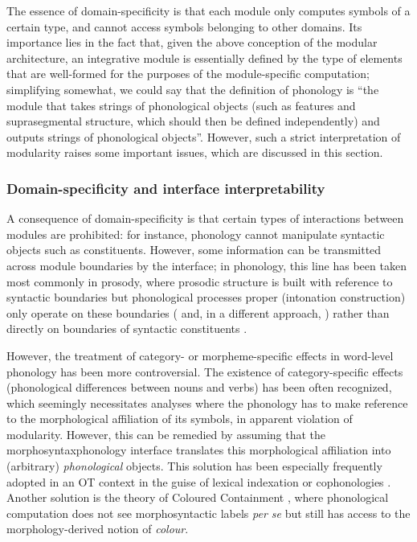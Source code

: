 The essence of domain\hyp specificity is that each module only computes symbols of a certain type, and cannot access symbols belonging to other domains. Its importance lies in the fact that, given the above conception of the modular architecture, an integrative module is essentially defined by the type of elements that are well\hyp formed for the purposes of the module\hyp specific computation; simplifying somewhat, we could say that the definition of phonology is \enquote{the module that takes strings of phonological objects (such as features and suprasegmental structure, which should then be defined independently) and outputs strings of phonological objects}. However, such a strict interpretation of modularity raises some important issues, which are discussed in this section.

\subsubsection{Domain-specificity and interface interpretability}
\label{sec:doma-spec-interf}

A consequence of domain\hyp specificity is that certain types of interactions between modules are prohibited: for instance, phonology cannot manipulate syntactic objects such as constituents. However, some information can be transmitted across module boundaries by the interface; in phonology, this line has been taken most commonly in prosody, where prosodic structure is built with reference to syntactic boundaries but phonological processes proper (\eg intonation construction) only operate on these boundaries (\citealp[\eg][]{selkirk,nspvgl,truckenbrodt,seidl} and, in a different approach, \citealt{scheer10:_guide_morph}) rather than directly on boundaries of syntactic constituents \citep[\egm][]{kaisse85:_connec,odden90:_syntax_kimat}.

However, the treatment of category- or morpheme\hyp specific effects in word\hyp level phonology has been more controversial. The existence of category\hyp specific effects (\eg phonological differences between nouns and verbs) has been often recognized, which seemingly necessitates analyses where the phonology has to make reference to the morphological affiliation of its symbols, in apparent violation of modularity. However, this can be remedied by assuming that the morphosyntax\endash phonology interface translates this morphological affiliation into (arbitrary) \emph{phonological} objects. This solution has been especially frequently adopted in an OT context in the guise of lexical indexation \citep[\egm][]{fukazawa97:_japan,itomester-strata,pater00:_non_englis,pater09:_morph,gouskova07:_tonkaw,gouskova11:_unexc,jurgec10:_disjun_lexic_strat} or cophonologies \citep[\egm][]{orgun96:_sign,orgun99:_sign,orgun02:_recon,inkelas98,inkelas05:_redup,inkelas07:_is,inkelasng}. Another solution is the theory of Coloured Containment \citep[\egm][]{van_oostendorp_coe}, where phonological computation does not see morphosyntactic labels \emph{per se} but still has access to the morphology\hyp derived notion of \emph{colour}.

